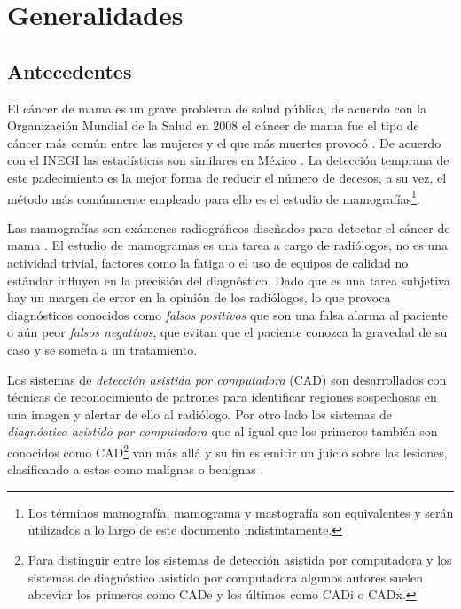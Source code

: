 \chapter{Generalidades}
\label{generalidades}

 \setcounter{page}{1}

\section{Antecedentes}

El cáncer de mama es un grave problema de salud pública, de acuerdo con la
Organización Mundial de la Salud en 2008 el cáncer de mama fue el tipo de
cáncer más común entre las mujeres y el que más muertes provocó
\cite{cancerreport}. De acuerdo con el INEGI las estadísticas son similares en
México \cite{mxcancer, inegi}. La detección temprana de este padecimiento es la
mejor forma de reducir el número de decesos, a su vez, el método más comúnmente
empleado para ello es el estudio de mamografías\footnote{Los términos
mamografía, mamograma y mastografía son equivalentes y serán utilizados a lo
largo de este documento indistintamente.}. 

Las mamografías son exámenes radiográficos diseñados para detectar el cáncer de
mama \cite{bushberg2011essential}. El estudio de mamogramas es una tarea a
cargo de radiólogos, no es una actividad trivial, factores como la fatiga o el
uso de equipos de calidad no estándar influyen en la precisión del diagnóstico.
Dado que es una tarea subjetiva hay un margen de error en la opinión de los
radiólogos, lo que provoca diagnósticos conocidos como \textit{falsos
positivos} que son una falsa alarma al paciente o aún peor \textit{falsos
negativos}, que evitan que el paciente conozca la gravedad de su caso y se
someta a un tratamiento.

Los sistemas de \textit{detección asistida por computadora} (CAD) son
desarrollados con técnicas de reconocimiento de patrones para identificar
regiones sospechosas en una imagen y alertar de ello al radiólogo. Por otro
lado los sistemas de \textit{diagnóstico asistido por computadora} que al igual
que los primeros también son conocidos como CAD\footnote{Para distinguir entre
los sistemas de detección asistida por computadora y los sistemas de
diagnóstico asistido por computadora algunos autores suelen abreviar los
primeros como CADe y los últimos como CADi o CADx.} van más allá y su fin es
emitir un juicio sobre las lesiones, clasificando a estas como malignas o
benignas \cite{castellino2005computer}. 

